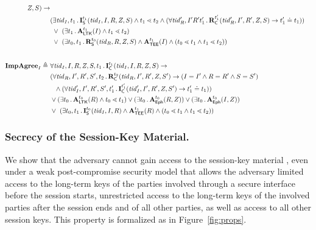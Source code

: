 \begin{figure*}[ht]
\begin{align*}
\mSessKey, S)
    \rightarrow\\
    &(\exists \mTID_I, t_1\mLogicDot \mIStart^{t_1}(\mTID_I, I, R, \mSessKey, S) \land t_1 \lessdot t_2
    \land (\forall \mTID_R', I' R' t_1' \mLogicDot \mRComplete^{t_1'}(\mTID_R', I' , R', \mSessKey, S)
        \rightarrow t_1' \doteq t_1))\\
    &\ \lor\ (\exists t_1\mLogicDot \mRevLTK^{t_1}(I) \land t_1 \lessdot t_2)\\
    &\ \lor\ (\exists t_0, t_1\mLogicDot \mRStart^{t_0}(\mTID_R, R, \mSessKey, S) \land \mTEE^{t_1}(I) \land (t_0 \lessdot t_1 \land t_1 \lessdot t_2))\\[2em]
%
    \mPredImpI \triangleq\ &
    \forall \mTID_I, I, R, \mSessKey, S, t_1\mLogicDot \mIComplete^{t_1}(\mTID_I, I, R, \mSessKey, 
S)
    \rightarrow\\
      &(\forall \mTID_R, I', R', S', t_2\mLogicDot \mRComplete^{t_2}(\mTID_R, I', R', \mSessKey, S') \rightarrow
             (I=I' \land R=R' \land S=S')\\
      &\ \ \land (\forall \mTID_I', I', R', S', t_1'\mLogicDot
        \mIComplete^{t_1'}(\mTID_I', I', R', \mSessKey, S') \rightarrow t_1' \doteq t_1
        ))\\
    &\lor(\exists t_0\mLogicDot \mRevLTK^{t_0}(R) \land t_0 \lessdot t_1)
    \lor(\exists t_0\mLogicDot \mRevEph^{t_0}(R, \mSessKey))
    \lor(\exists t_0\mLogicDot \mRevEph^{t_0}(I, \mSessKey))\\
    &\lor\ (\exists t_0, t_1\mLogicDot \mIStart^{t_0}(\mTID_I, I, R) \land \mTEE^{t_1}(R) \land (t_0 \lessdot t_1 \land t_1 \lessdot t_2))
\end{align*}
%
\caption{Formalization of security properties and adversary model.}
\label{fig:props}
\end{figure*}


\subsubsection{Secrecy of the Session-Key Material.}
\label{sec:secrecy}
We show that the adversary cannot gain access to the session-key material
\mSessKey{}, even under a weak post-compromise security model that allows the
adversary limited access to the long-term keys of the parties involved through a
secure interface before the session starts, unrestricted access to the long-term
keys of the involved parties after the session ends and of all other parties, as
well as access to all other session keys.
%
This property is formalized as \mPredPcs{} in Figure~\ref{fig:props}.
%

